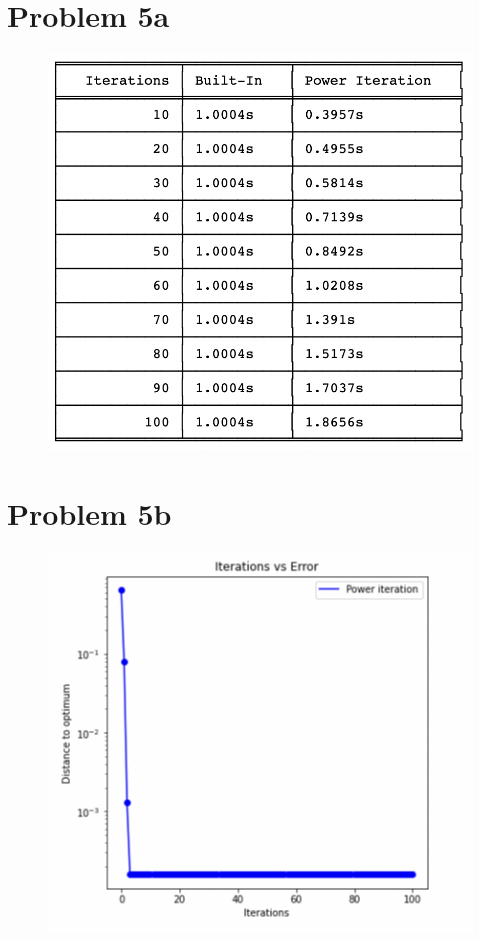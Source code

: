 \documentclass[12pt, letterpaper]{article}
\begin{document}
\newpage
\section{Problem 5a}
\begin{figure}[h!]
  \includegraphics[scale=0.7]{./img/5a}
\end{figure}


\newpage
\section{Problem 5b}
\begin{figure}[h!]
  \includegraphics[scale=0.7]{./img/5b}
\end{figure}
\end{document}
